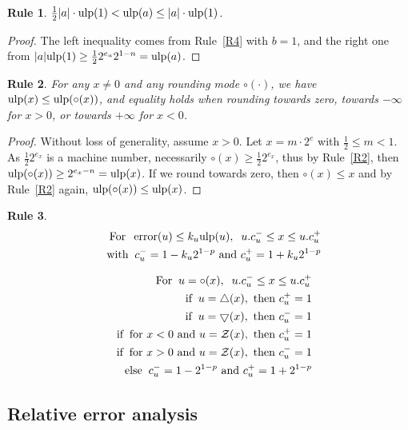 \documentclass[12pt]{amsart}
\def\n{\textnormal}
\def\pinf{\bigtriangleup}
\def\minf{\bigtriangledown}
\def\ulp{{\rm ulp}}
\def\Z{{\mathcal Z}}
\DeclareMathOperator{\error}{error}
\newtheorem{Rule}{Rule}
\begin{document}
\begin{Rule} \label{R7}
$\frac{1}{2} |a| \cdot \ulp(1) < \ulp(a) \leq |a| \cdot \ulp(1)$.
\end{Rule}
\begin{proof}
The left inequality comes from Rule~\ref{R4} with $b=1$,
and the right one from $|a| \ulp(1) \geq \frac{1}{2} 2^{e_a} 2^{1-n} =\ulp(a)$.
\end{proof}

\begin{Rule} \label{R8}
For any $x \neq 0$ and any rounding mode $\circ(\cdot)$,
we have $\ulp(x) \leq \ulp(\circ(x))$, and equality holds when rounding towards
zero, towards $-\infty$ for $x>0$, or towards $+\infty$ for $x<0$.
\end{Rule}
\begin{proof}
Without loss of generality, assume $x > 0$.
Let $x = m \cdot 2^e$ with $\frac{1}{2} \leq m < 1$.
As $\frac{1}{2} 2^{e_x}$ is a machine number, necessarily $\circ(x) \geq
\frac{1}{2} 2^{e_x}$, thus by Rule~\ref{R2}, then $\ulp(\circ(x)) \geq
2^{e_x - n} = \ulp(x)$.
If we round towards zero, then $\circ(x) \leq x$ and by Rule~\ref{R2} again,
$\ulp(\circ(x)) \leq \ulp(x)$.
\end{proof}

\begin{Rule} \label{R9}
\begin{eqnarray}\nonumber
&&\n{For}\;\;  \error(u) \leq k_u \ulp(u),\;\; u.c_u^- \leq x \leq u.c_u^+\\\nonumber
&&\n{with}\;\;   c_u^{-}=1- k_u 2^{1-p} \n{ and } c_u^{+}=1+ k_u 2^{1-p}
\end{eqnarray}

\begin{eqnarray}\nonumber
&&\n{For}\;\;  u=\circ(x),\;\; u.c_u^- \leq x \leq u.c_u^+\\\nonumber
&&\n{if}\;\;  u=\pinf(x),\n{ then } c_u^+=1\\\nonumber
&&\n{if}\;\;  u=\minf(x),\n{ then } c_u^-=1\\\nonumber
&&\n{if}\;\;  \n{for $x<0$ and } u=\Z(x),\n{ then } c_u^+=1 \\\nonumber
&&\n{if}\;\;  \n{for $x>0$ and } u=\Z(x),\n{ then } c_u^-=1 \\\nonumber
&&\n{else}\;\;   c_u^{-}=1-2^{1-p} \n{ and } c_u^{+}=1+2^{1-p}
\end{eqnarray}
\end{Rule}

\subsection{Relative error analysis}
\end{document}
